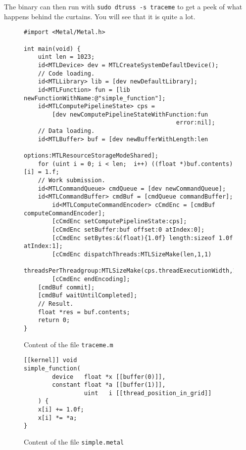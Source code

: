 \documentclass{sapthesis}
\begin{document}
The binary can then run with \texttt{sudo dtruss -s traceme} to get a peek of
what happens behind the curtains. You will see that it is quite a lot.

\begin{figure}
\centering
\begin{minipage}{\textwidth}
\footnotesize
\begin{verbatim}
#import <Metal/Metal.h>

int main(void) {
    uint len = 1023;
    id<MTLDevice> dev = MTLCreateSystemDefaultDevice();
    // Code loading.
    id<MTLLibrary> lib = [dev newDefaultLibrary];
    id<MTLFunction> fun = [lib newFunctionWithName:@"simple_function"];
    id<MTLComputePipelineState> cps =
        [dev newComputePipelineStateWithFunction:fun
                                           error:nil];
    // Data loading.
    id<MTLBuffer> buf = [dev newBufferWithLength:len
                                         options:MTLResourceStorageModeShared];
    for (uint i = 0; i < len;  i++) ((float *)buf.contents)[i] = 1.f;
    // Work submission.
    id<MTLCommandQueue> cmdQueue = [dev newCommandQueue];
    id<MTLCommandBuffer> cmdBuf = [cmdQueue commandBuffer];
        id<MTLComputeCommandEncoder> cCmdEnc = [cmdBuf computeCommandEncoder];
        [cCmdEnc setComputePipelineState:cps];
        [cCmdEnc setBuffer:buf offset:0 atIndex:0];
        [cCmdEnc setBytes:&(float){1.0f} length:sizeof 1.0f atIndex:1];
        [cCmdEnc dispatchThreads:MTLSizeMake(len,1,1)
           threadsPerThreadgroup:MTLSizeMake(cps.threadExecutionWidth,1,1)];
        [cCmdEnc endEncoding];
    [cmdBuf commit];
    [cmdBuf waitUntilCompleted];
    // Result.
    float *res = buf.contents;
    return 0;
}
\end{verbatim}
\end{minipage}
\caption{Content of the file \texttt{traceme.m}}
\label{fig:metal1}
\end{figure}

\begin{figure}
\centering
\begin{minipage}{\textwidth}
\footnotesize
\begin{verbatim}
[[kernel]] void
simple_function(
        device   float *x [[buffer(0)]],
        constant float *a [[buffer(1)]],
                 uint   i [[thread_position_in_grid]]
    ) {
    x[i] += 1.0f;
    x[i] *= *a;
}
\end{verbatim}
\end{minipage}
\caption{Content of the file \texttt{simple.metal}}
\label{fig:metal2}
\end{figure}
\end{document}
